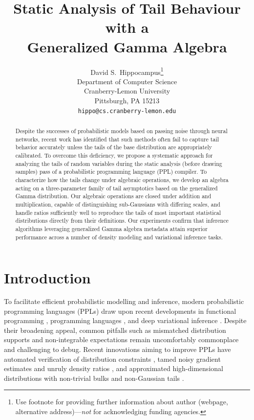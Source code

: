 \documentclass{article}
\title{Static Analysis of Tail Behaviour with a \\ Generalized Gamma Algebra}
\author{%
  David S.~Hippocampus\thanks{Use footnote for providing further information
    about author (webpage, alternative address)---\emph{not} for acknowledging
    funding agencies.} \\
  Department of Computer Science\\
  Cranberry-Lemon University\\
  Pittsburgh, PA 15213 \\
  \texttt{hippo@cs.cranberry-lemon.edu} \\
}
\theoremstyle{definition}
\begin{document}
\maketitle

\begin{abstract}
	Despite the successes of probabilistic models based on passing noise through
	neural networks, recent work has identified that such methods often fail to
	capture tail behavior accurately unless the tails of the base distribution
	are appropriately calibrated. To overcome this deficiency, we propose a
	systematic approach for analyzing the tails of random variables during the
	static analysis (before drawing samples) pass of a probabilistic programming
	language (PPL) compiler. To characterize how the tails change under
	algebraic operations, we develop an algebra acting on a three-parameter
	family of tail asymptotics based on the generalized Gamma distribution. Our
	algebraic operations are closed under addition and multiplication, capable
	of distinguishing sub-Gaussians with differing scales, and handle ratios
	sufficiently well to reproduce the tails of most important statistical
	distributions directly from their definitions. Our experiments confirm that
	inference algorithms leveraging generalized Gamma algebra metadata attain
	superior performance across a number of density modeling and variational
	inference tasks.
\end{abstract}

\section{Introduction}

To facilitate efficient probabilistic modelling and inference, modern probabilistic programming languages (PPLs) draw upon recent developments in functional programming \citep{tolpin2016design},
programming languages \citep{bernstein2019static}, 
and deep variational inference \citep{bingham2019pyro}.
Despite their broadening appeal, common pitfalls such as mismatched
distribution supports \citep{lee2019towards} and non-integrable expectations
\citep{wang2018variational,vehtari2015pareto,yao2018yes} remain uncomfortably
commonplace and challenging to debug.
Recent innovations aiming to improve PPLs have automated verification of
distribution constraints \citep{lee2019towards}, tamed noisy gradient estimates
\citep{eslami2016attend} and unruly density ratios
\citep{vehtari2015pareto,wang2018variational}, and approximated high-dimensional
distributions with non-trivial bulks \citep{papamakarios2021normalizing} and non-Gaussian tails \cite{jaini2020tails}. 
\end{document}
